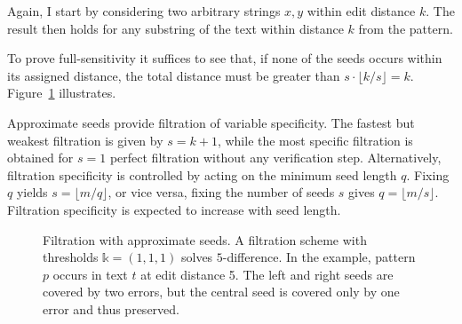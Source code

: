 Again, I start by considering two arbitrary strings $x,y$ within edit distance $k$.
The result then holds for any substring of the text within distance $k$ from the pattern.
To prove full-sensitivity it suffices to see that, if none of the seeds occurs within its assigned distance, the total distance must be greater than $s \cdot \lfloor k/s \rfloor = k$.
Figure~\ref{fig:seeds-apx} illustrates.

Approximate seeds provide filtration of variable specificity.
The fastest but weakest filtration is given by $s=k+1$, while the most specific filtration is obtained for $s=1$ \ie perfect filtration without any verification step.
Alternatively, filtration specificity is controlled by acting on the minimum seed length $q$.
Fixing $q$ yields $s = \lfloor m/q \rfloor$, or vice versa, fixing the number of seeds $s$ gives $q =\lfloor m/s \rfloor$.
Filtration specificity is expected to increase with seed length.

\begin{figure}[h]
\begin{center}
\caption[Filtration with approximate seeds]{Filtration with approximate seeds. A filtration scheme with thresholds $\mathbb{k} = (1,1,1)$ solves $5$-difference. In the example, pattern $p$ occurs in text $t$ at edit distance 5. The left and right seeds are covered by two errors, but the central seed is covered only by one error and thus preserved.}
\label{fig:seeds-apx}

\end{center}
\end{figure}


